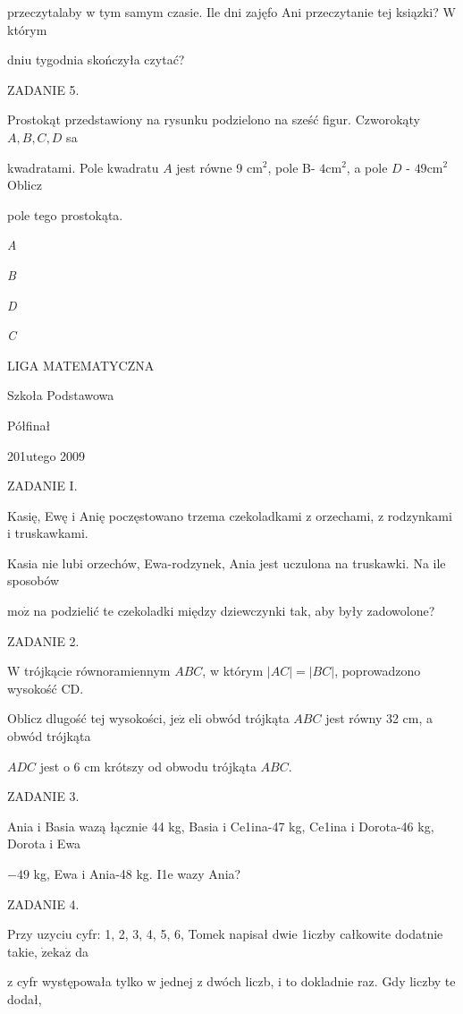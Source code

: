 \documentclass[a4paper,12pt]{article}
\begin{document}
przeczytalaby w tym samym czasie. Ile dni zajęfo Ani przeczytanie tej ksiązki? $\mathrm{W}$ którym

dniu tygodnia skończyła czytać?

ZADANIE 5.

Prostokąt przedstawiony na rysunku podzielono na sześć figur. Czworokąty $A, B, C, D$ sa

kwadratami. Pole kwadratu $A$ jest równe 9 $\mathrm{c}\mathrm{m}^{2}$, pole B- $4\mathrm{c}\mathrm{m}^{2}$, a pole $D$ - $49\mathrm{c}\mathrm{m}^{2}$ Oblicz

pole tego prostokąta.

{\it A}

{\it B}

{\it D}

{\it C}






LIGA MATEMATYCZNA

Szkoła Podstawowa

Półfinał

201utego 2009

ZADANIE I.

Kasię, Ewę i Anię poczęstowano trzema czekoladkami z orzechami, z rodzynkami i truskawkami.

Kasia nie lubi orzechów, Ewa-rodzynek, Ania jest uczulona na truskawki. Na ile sposobów

$\mathrm{m}\mathrm{o}\dot{\mathrm{z}}$ na podzielić te czekoladki między dziewczynki tak, aby były zadowolone?

ZADANIE 2.

$\mathrm{W}$ trójkącie równoramiennym $ABC$, w którym $|AC| = |BC|$, poprowadzono wysokość CD.

Oblicz dlugość tej wysokości, $\mathrm{j}\mathrm{e}\dot{\mathrm{z}}$ eli obwód trójkąta $ABC$ jest równy 32 cm, a obwód trójkąta

$ADC$ jest o 6 cm krótszy od obwodu trójkąta $ABC.$

ZADANIE 3.

Ania i Basia wazą łącznie 44 kg, Basia i Ce1ina-47 kg, Ce1ina i Dorota-46 kg, Dorota i Ewa

$-49$ kg, Ewa i Ania-48 kg. I1e wazy Ania?

ZADANIE 4.

Przy uzyciu cyfr: 1, 2, 3, 4, 5, 6, Tomek napisał dwie 1iczby całkowite dodatnie takie, $\dot{\mathrm{z}}\mathrm{e}\mathrm{k}\mathrm{a}\dot{\mathrm{z}}$ da

z cyfr występowała tylko w jednej z dwóch liczb, i to dokladnie raz. Gdy liczby te dodał,
\end{document}
